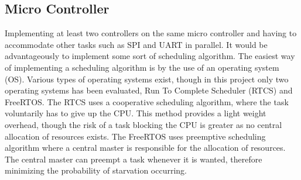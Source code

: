 \documentclass[../../main.tex]{subfiles}
\begin{document}
\subsection*{Micro Controller}
Implementing at least two controllers on the same micro controller and having to accommodate other tasks such as SPI and UART in parallel. It would be advantageously to implement some sort of scheduling algorithm. The easiest way of implementing a scheduling algorithm is by the use of an operating system (OS). Various types of operating systems exist, though in this project only two operating systems has been evaluated, Run To Complete Scheduler (RTCS) and FreeRTOS. The RTCS uses a cooperative scheduling algorithm, where the task voluntarily has to give up the CPU. This method provides a light weight overhead, though the risk of a task blocking the CPU is greater as no central allocation of resources exists. %
The FreeRTOS uses preemptive scheduling algorithm where a central master is responsible for the allocation of resources. The central master can preempt a task whenever it is wanted, therefore minimizing the probability of starvation occurring.





\end{document}
